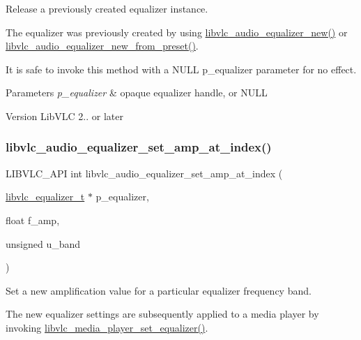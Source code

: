 Release a previously created equalizer instance.

The equalizer was previously created by using \hyperlink{group__libvlc__audio_gad252fff10bf02bc8436b3beab4badef9}{libvlc\+\_\+audio\+\_\+equalizer\+\_\+new()} or \hyperlink{group__libvlc__audio_ga41d6921b8a10f90c4ad9fd3bf844f035}{libvlc\+\_\+audio\+\_\+equalizer\+\_\+new\+\_\+from\+\_\+preset()}.

It is safe to invoke this method with a N\+U\+LL p\+\_\+equalizer parameter for no effect.


\begin{DoxyParams}{Parameters}
{\em p\+\_\+equalizer} & opaque equalizer handle, or N\+U\+LL \\
\hline
\end{DoxyParams}
\begin{DoxyVersion}{Version}
Lib\+V\+LC 2.. or later 
\end{DoxyVersion}
\mbox{\label{group__libvlc__audio_ga619c39485ef5f963be8829bc627326f0}} 
\subsubsection{\texorpdfstring{libvlc\+\_\+audio\+\_\+equalizer\+\_\+set\+\_\+amp\+\_\+at\+\_\+index()}{libvlc\_audio\_equalizer\_set\_amp\_at\_index()}}
{\footnotesize\ttfamily L\+I\+B\+V\+L\+C\+\_\+\+A\+PI int libvlc\+\_\+audio\+\_\+equalizer\+\_\+set\+\_\+amp\+\_\+at\+\_\+index (\begin{DoxyParamCaption}\item[{\hyperlink{group__libvlc__media__player_ga1ea141a84d68d0147fc58d99bfc83ab7}{libvlc\+\_\+equalizer\+\_\+t} $\ast$}]{p\+\_\+equalizer,  }\item[{float}]{f\+\_\+amp,  }\item[{unsigned}]{u\+\_\+band }\end{DoxyParamCaption})}

Set a new amplification value for a particular equalizer frequency band.

The new equalizer settings are subsequently applied to a media player by invoking \hyperlink{group__libvlc__audio_ga0d355443d391d0bc2dafe9b6963a8f53}{libvlc\+\_\+media\+\_\+player\+\_\+set\+\_\+equalizer()}.

